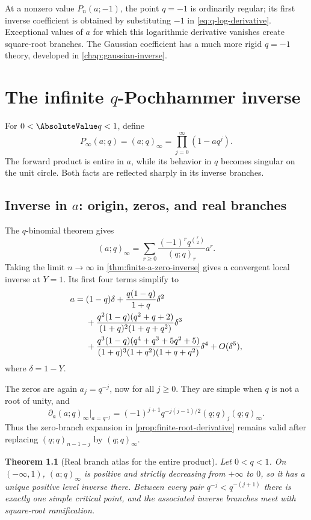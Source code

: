 \documentclass[11pt,a4paper,oneside,openany]{book}
\newtheorem{theorem}{Theorem}[chapter]
\theoremstyle{definition}
\theoremstyle{remark}
\begin{document}
At a nonzero value \(P_n(a;-1)\), the point \(q=-1\) is ordinarily regular;
its first inverse coefficient is obtained by substituting \(-1\) in
\eqref{eq:q-log-derivative}.  Exceptional values of \(a\) for which this
logarithmic derivative vanishes create square-root branches.  The Gaussian
coefficient has a much more rigid \(q=-1\) theory, developed in
\cref{chap:gaussian-inverse}.

\chapter{The infinite \texorpdfstring{$q$}{q}-Pochhammer inverse}

For \(0<\AbsoluteValue q<1\), define
\[
 P_\infty(a;q)=(a;q)_\infty=\prod_{j=0}^\infty(1-aq^j).
\]
The forward product is entire in \(a\), while its behavior in \(q\) becomes
singular on the unit circle.  Both facts are reflected sharply in its
inverse branches.

\section{Inverse in \texorpdfstring{$a$}{a}: origin, zeros, and real branches}

The \(q\)-binomial theorem gives
\[
 (a;q)_\infty=\sum_{r\ge0}\frac{(-1)^r q^{\binom r2}}{(q;q)_r}a^r.
\]
Taking the limit \(n\to\infty\) in \cref{thm:finite-a-zero-inverse} gives a
convergent local inverse at \(Y=1\).  Its first four terms simplify to
\begin{align}
 a={}&(1-q)\delta
 +\frac{q(1-q)}{1+q}\delta^2\notag\\
 &+\frac{q^2(1-q)(q^2+q+2)}{(1+q)^2(1+q+q^2)}\delta^3\notag\\
 &+\frac{q^3(1-q)(q^4+q^3+5q^2+5)}
 {(1+q)^3(1+q^2)(1+q+q^2)}\delta^4+O(\delta^5),
\label{eq:infinite-a-origin-inverse}
\end{align}
where \(\delta=1-Y\).

The zeros are again \(a_j=q^{-j}\), now for all \(j\ge0\).  They are simple
when \(q\) is not a root of unity, and
\begin{equation}\label{eq:infinite-root-derivative}
 \partial_a(a;q)_\infty\big|_{a=q^{-j}}
 =(-1)^{j+1}q^{-j(j-1)/2}(q;q)_j(q;q)_\infty.
\end{equation}
Thus the zero-branch expansion in \cref{prop:finite-root-derivative} remains
valid after replacing \((q;q)_{n-1-j}\) by \((q;q)_\infty\).

\begin{theorem}[Real branch atlas for the entire product]\label{thm:infinite-a-real-atlas}
Let \(0<q<1\).  On \(( -\infty,1)\), \((a;q)_\infty\) is positive and
strictly decreasing from \(+\infty\) to \(0\), so it has a unique positive
level inverse there.  Between every pair \(q^{-j}<q^{-(j+1)}\) there is
exactly one simple critical point, and the associated inverse branches meet
with square-root ramification.
\end{theorem}
\end{document}
